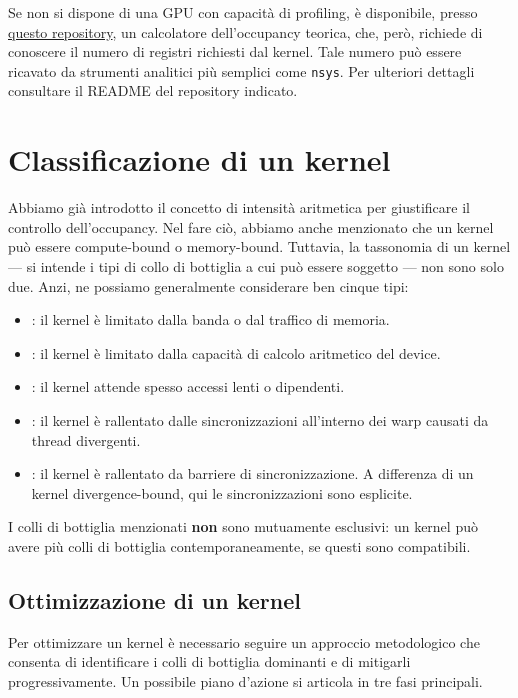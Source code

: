 \begin{note}{}
Se non si dispone di una GPU con capacità di profiling, è disponibile, presso \href{https://github.com/riccardoregina/High-Performance-Computing}{questo repository}, un calcolatore dell'occupancy teorica, che, però, richiede di conoscere il numero di registri richiesti dal kernel.
Tale numero può essere ricavato da strumenti analitici più semplici come \texttt{nsys}.
Per ulteriori dettagli consultare il README del repository indicato.
\end{note}

\section{Classificazione di un kernel}
Abbiamo già introdotto il concetto di intensità aritmetica per giustificare il controllo dell'occupancy.
Nel fare ciò, abbiamo anche menzionato che un kernel può essere compute-bound o memory-bound.
Tuttavia, la tassonomia di un kernel --- si intende i tipi di collo di bottiglia a cui può essere soggetto --- non sono solo due.
Anzi, ne possiamo generalmente considerare ben cinque tipi:
\begin{itemize}
    \item {}: il kernel è limitato dalla banda o dal traffico di memoria.
    \item {}: il kernel è limitato dalla capacità di calcolo aritmetico del device.
    \item {}: il kernel attende spesso accessi lenti o dipendenti.
    \item {}: il kernel è rallentato dalle sincronizzazioni all'interno dei warp causati da thread divergenti.
    \item {}: il kernel è rallentato da barriere di sincronizzazione. A differenza di un kernel divergence-bound, qui le sincronizzazioni sono esplicite.
\end{itemize}
I colli di bottiglia menzionati \textbf{non} sono mutuamente esclusivi: un kernel può avere più colli di bottiglia contemporaneamente, se questi sono compatibili.

\subsection{Ottimizzazione di un kernel}
Per ottimizzare un kernel è necessario seguire un approccio metodologico che consenta di identificare i colli di bottiglia dominanti e di mitigarli progressivamente. Un possibile piano d'azione si articola in tre fasi principali.

